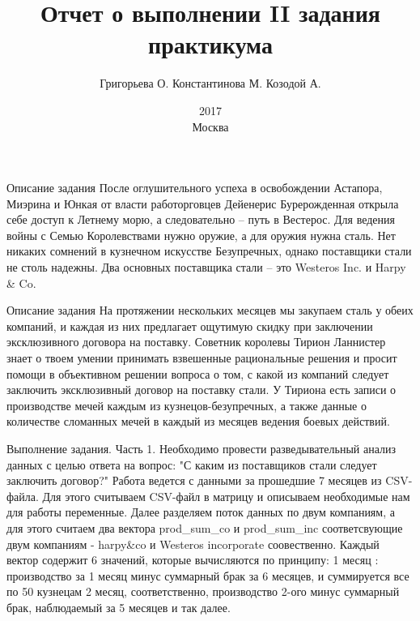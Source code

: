 \documentclass{beamer}
\begin{document}
\title{Отчет о выполнении II задания практикума}  
\author{Григорьева О. Константинова М. Козодой А.}
\date{ 2017\\Москва} 
\thispagestyle{empty}
\frame{\titlepage} 

\begin{frame}{Описание задания}
	После оглушительного успеха в освобождении Астапора, Миэрина и Юнкая от власти работорговцев Дейенерис Бурерожденная открыла себе доступ к Летнему морю, а следовательно -- путь в Вестерос.
	Для ведения войны с Семью Королевствами нужно оружие, а для оружия нужна сталь. Нет никаких сомнений в кузнечном искусстве Безупречных, однако поставщики стали не столь надежны.
	Два основных поставщика стали -- это Westeros Inc. и Harpy & Co. 
\end{frame}

\begin{frame}{Описание задания}
	На протяжении нескольких месяцев мы закупаем сталь у обеих компаний, и каждая из них предлагает ощутимую скидку при заключении эксклюзивного договора на поставку.
	Советник королевы Тирион Ланнистер знает о твоем умении принимать взвешенные рациональные решения и просит помощи в объективном решении вопроса о том, с какой из компаний следует заключить эксклюзивный договор на поставку стали.
	У Тириона есть записи о производстве мечей каждым из кузнецов-безупречных, а также данные о количестве сломанных мечей в каждый из месяцев ведения боевых действий.
\end{frame}


\begin{frame}{Выполнение задания. Часть 1.}
Необходимо провести разведывательный анализ данных с целью ответа на вопрос: "С каким из поставщиков стали следует заключить договор?" Работа ведется с  данными за прошедшие 7 месяцев из CSV-файла.	
Для этого считываем CSV-файл в матрицу и описываем необходимые нам для работы переменные.
Далее разделяем поток данных по двум компаниям, а для этого считаем два вектора prod{\_}sum{\_}co и prod{\_}sum{\_}inc соответсвующие двум компаниям - harpy&co и Westeros incorporate соовественно.
Каждый вектор содержит 6 значений, которые вычисляются по принципу:
1 месяц : производство за 1 месяц минус суммарный брак за 6 месяцев, и суммируется все по 50 кузнецам
2 месяц, соответственно, производство 2-ого минус суммарный брак, наблюдаемый за 5 месяцев и так далее.
\end{frame}
\end{document}
